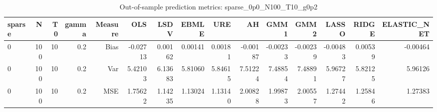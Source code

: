 \begin{table}[!htbp]\centering
\caption{Out-of-sample prediction metrics: sparse_0p0_N100_T10_g0p2}
\label{tab:table3_sparse_0p0_N100_T10_g0p2}
\begin{tabular}{lrrrrrrrrrrrrrr}
\hline
sparse & N & T0 & gamma & Measure & OLS & LSDV & EBMLE & URE & AH & GMM1 & GMM2 & LASSO & RIDGE & ELASTIC_NET \\
\hline
0 & 100 & 10 & 0.2 & Bias & -0.02713 & 0.00162 & 0.00141 & 0.00181 & -0.00187 & -0.00233 & -0.00239 & -0.00483 & 0.00539 & -0.00464 \\
0 & 100 & 10 & 0.2 & Var & 5.42103 & 6.13683 & 5.81060 & 5.84615 & 7.51224 & 7.48854 & 7.48891 & 5.96727 & 5.82125 & 5.96126 \\
0 & 100 & 10 & 0.2 & MSE & 1.75622 & 1.14235 & 1.13024 & 1.13140 & 2.00828 & 1.99873 & 2.00557 & 1.27442 & 1.25846 & 1.27383 \\
\hline
\end{tabular}
\end{table}

